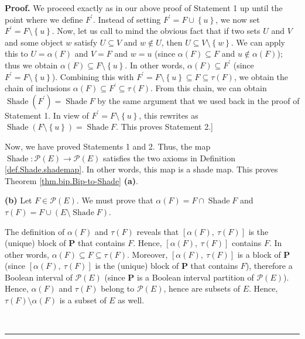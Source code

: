 \documentclass[numbers=enddot,12pt,final,onecolumn]{scrartcl}%
\theoremstyle{definition}
\newenvironment{proof}[1][Proof]{\noindent\textbf{#1.} }{\ \rule{0.5em}{0.5em}}
\newenvironment{verlong}{}{}
\begin{document}
\begin{proof}
\begin{verlong}
We proceed exactly as in our above proof of Statement 1 up until the point
where we define $F^{\prime}$. Instead of setting $F^{\prime}=F\cup\left\{
u\right\}  $, we now set $F^{\prime}=F\setminus\left\{  u\right\}  $. Now, let
us call to mind the obvious fact that if two sets $U$ and $V$ and some object
$w$ satisfy $U\subseteq V$ and $w\notin U$, then $U\subseteq V\setminus
\left\{  w\right\}  $. We can apply this to $U=\alpha\left(  F\right)  $ and
$V=F$ and $w=u$ (since $\alpha\left(  F\right)  \subseteq F$ and
$u\notin\alpha\left(  F\right)  $); thus we obtain $\alpha\left(  F\right)
\subseteq F\setminus\left\{  u\right\}  $. In other words, $\alpha\left(
F\right)  \subseteq F^{\prime}$ (since $F^{\prime}=F\setminus\left\{
u\right\}  $). Combining this with $F^{\prime}=F\setminus\left\{  u\right\}
\subseteq F\subseteq\tau\left(  F\right)  $, we obtain the chain of inclusions
$\alpha\left(  F\right)  \subseteq F^{\prime}\subseteq\tau\left(  F\right)  $.
From this chain, we can obtain $\operatorname*{Shade}\left(  F^{\prime
}\right)  =\operatorname*{Shade}F$ by the same argument that we used back in
the proof of Statement 1. In view of $F^{\prime}=F\setminus\left\{  u\right\}
$, this rewrites as $\operatorname*{Shade}\left(  F\setminus\left\{
u\right\}  \right)  =\operatorname*{Shade}F$. This proves Statement 2.]
\end{verlong}

Now, we have proved Statements 1 and 2. Thus, the map $\operatorname*{Shade}%
:\mathcal{P}\left(  E\right)  \rightarrow\mathcal{P}\left(  E\right)  $
satisfies the two axioms in Definition \ref{def.Shade.shademap}. In other
words, this map is a shade map. This proves Theorem \ref{thm.bip.Bip-to-Shade}
\textbf{(a)}.

\textbf{(b)} Let $F\in\mathcal{P}\left(  E\right)  $. We must prove that
$\alpha\left(  F\right)  =F\cap\operatorname*{Shade}F$ and $\tau\left(
F\right)  =F\cup\left(  E\setminus\operatorname*{Shade}F\right)  $.

The definition of $\alpha\left(  F\right)  $ and $\tau\left(  F\right)  $
reveals that $\left[  \alpha\left(  F\right)  ,\ \tau\left(  F\right)
\right]  $ is the (unique) block of $\mathbf{P}$ that contains $F$. Hence,
$\left[  \alpha\left(  F\right)  ,\ \tau\left(  F\right)  \right]  $ contains
$F$. In other words, $\alpha\left(  F\right)  \subseteq F\subseteq\tau\left(
F\right)  $. Moreover, $\left[  \alpha\left(  F\right)  ,\ \tau\left(
F\right)  \right]  $ is a block of $\mathbf{P}$ (since $\left[  \alpha\left(
F\right)  ,\ \tau\left(  F\right)  \right]  $ is the (unique) block of
$\mathbf{P}$ that contains $F$), therefore a Boolean interval of
$\mathcal{P}\left(  E\right)  $ (since $\mathbf{P}$ is a Boolean interval
partition of $\mathcal{P}\left(  E\right)  $). Hence, $\alpha\left(  F\right)
$ and $\tau\left(  F\right)  $ belong to $\mathcal{P}\left(  E\right)  $,
hence are subsets of $E$. Hence, $\tau\left(  F\right)  \setminus\alpha\left(
F\right)  $ is a subset of $E$ as well.


\end{proof}
\end{document}
